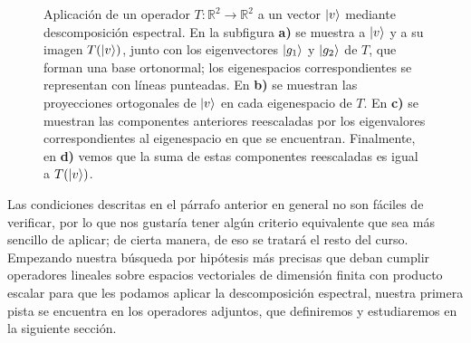 \documentclass[12pt,dvipsnames]{article}
\begin{document}
\begin{figure}[h!]
\hspace{3mm}
\caption{Aplicación de un operador $T:\mathbb{R}^2\to \mathbb{R}^2$ a un vector $\ket{v}$ mediante descomposición espectral. En la subfigura \textbf{a)} se muestra a $\ket{v}$ y a su imagen $T(\ket{v})$, junto con los eigenvectores $\ket{g_1}$ y $\ket{g_2}$ de $T$, que forman una base ortonormal; los eigenespacios correspondientes se representan con líneas punteadas. En \textbf{b)} se muestran las proyecciones ortogonales de $\ket{v}$ en cada eigenespacio de $T$. En \textbf{c)} se muestran las componentes anteriores reescaladas por los eigenvalores correspondientes al eigenespacio en que se encuentran. Finalmente, en \textbf{d)} vemos que la suma de estas componentes reescaladas es igual a $T(\ket{v})$.}
    \label{fig:8}
\end{figure}

\vspace{3mm}
Las condiciones descritas en el párrafo anterior en general no son fáciles de verificar, por lo que nos gustaría tener algún criterio equivalente que sea más sencillo de aplicar; de cierta manera, de eso se tratará el resto del curso. Empezando nuestra búsqueda por hipótesis más precisas que deban cumplir operadores lineales sobre espacios vectoriales de dimensión finita con producto escalar para que les podamos aplicar la descomposición espectral, nuestra primera pista se encuentra en los operadores adjuntos, que definiremos y estudiaremos en la siguiente sección.
\end{document}
